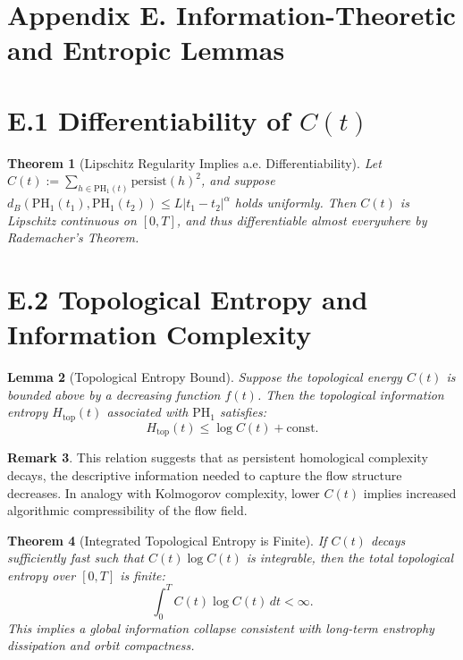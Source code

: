 \documentclass[11pt]{article}
\newtheorem{theorem}{Theorem}[section]
\newtheorem{lemma}[theorem]{Lemma}
\theoremstyle{definition}
\newtheorem{remark}[theorem]{Remark}
\begin{document}

\section*{Appendix E. Information-Theoretic and Entropic Lemmas}
\label{sec:appendixE}

\section*{E.1 Differentiability of $C(t)$}
\begin{theorem}[Lipschitz Regularity Implies a.e. Differentiability]
Let $C(t) := \sum_{h \in \mathrm{PH}_1(t)} \mathrm{persist}(h)^2$, and suppose $d_B(\mathrm{PH}_1(t_1), \mathrm{PH}_1(t_2)) \leq L |t_1 - t_2|^\alpha$ holds uniformly. Then $C(t)$ is Lipschitz continuous on $[0,T]$, and thus differentiable almost everywhere by Rademacher’s Theorem.
\end{theorem}

\section*{E.2 Topological Entropy and Information Complexity}
\begin{lemma}[Topological Entropy Bound]
Suppose the topological energy $C(t)$ is bounded above by a decreasing function $f(t)$. Then the topological information entropy $H_\text{top}(t)$ associated with $\mathrm{PH}_1$ satisfies:
\[
H_\text{top}(t) \leq \log C(t) + \text{const}.
\]
\end{lemma}

\begin{remark}
This relation suggests that as persistent homological complexity decays, the descriptive information needed to capture the flow structure decreases. In analogy with Kolmogorov complexity, lower $C(t)$ implies increased algorithmic compressibility of the flow field.
\end{remark}

\begin{theorem}[Integrated Topological Entropy is Finite]
If $C(t)$ decays sufficiently fast such that $C(t) \log C(t)$ is integrable, then the total topological entropy over $[0,T]$ is finite:
\[
\int_0^T C(t) \log C(t)\, dt < \infty.
\]
This implies a global information collapse consistent with long-term enstrophy dissipation and orbit compactness.
\end{theorem}
\end{document}
